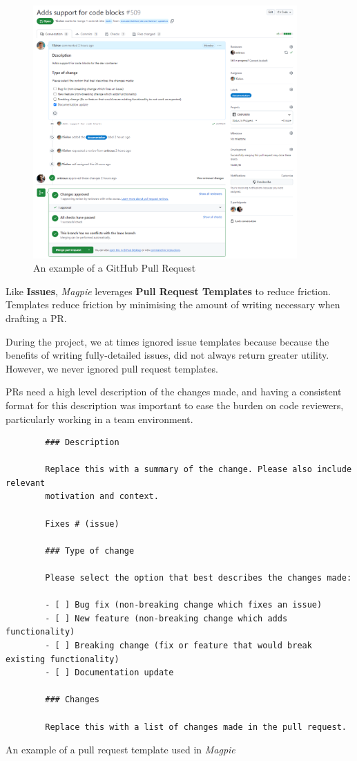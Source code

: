 \documentclass[preview]{standalone}
\begin{document}
\begin{figure}[htbp]
    \centering{}
    \includegraphics[width=0.90\textwidth]{images/github_pr.png}
    \caption{An example of a GitHub Pull Request}
\end{figure}

\newpage{}

Like \textbf{Issues}, \textit{Magpie} leverages \textbf{Pull Request Templates}
to reduce friction. Templates reduce friction by minimising the amount of
writing necessary when drafting a PR.

During the project, we at times ignored issue templates because because the
benefits of writing fully-detailed issues, did not always return greater
utility. However, we never ignored pull request templates.

PRs need a high level description of the changes made, and having a consistent
format for this description was important to ease the burden on code reviewers,
particularly working in a team environment.

\begin{listing}[htbp]
    \centering{}
    \begin{verbatim}
        ### Description

        Replace this with a summary of the change. Please also include relevant
        motivation and context.

        Fixes # (issue)

        ### Type of change

        Please select the option that best describes the changes made:

        - [ ] Bug fix (non-breaking change which fixes an issue)
        - [ ] New feature (non-breaking change which adds functionality)
        - [ ] Breaking change (fix or feature that would break existing functionality)
        - [ ] Documentation update

        ### Changes

        Replace this with a list of changes made in the pull request.
    \end{verbatim}
    \caption{An example of a pull request template used in \textit{Magpie}}
\end{listing}
\end{document}
